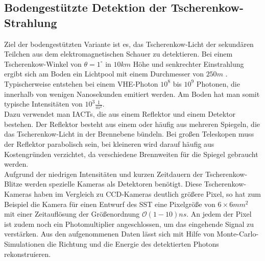 \subsection{Bodengestützte Detektion der Tscherenkow-Strahlung}
Ziel der bodengestützten Variante ist es, das Tscherenkow-Licht der sekundären Teilchen aus dem elektromagnetischen Schauer zu detektieren. Bei einem Tscherenkow-Winkel von $\theta=1^{\circ}$ in $10\unit{km}$ Höhe und senkrechter Einstrahlung ergibt sich am Boden ein Lichtpool mit einem Durchmesser von $250\unit{m}$ \cite{DesignConcept}.%
Typischerweise entstehen bei einem VHE-Photon $10^8$ bis $10^9$ Photonen, die innerhalb von wenigen Nanosekunden emitiert werden. Am Boden hat man somit typische Intensitäten von $10^3\unit{\frac{1}{m^2}}$.\\%
Dazu verwendet man IACTs, die aus einem Reflektor und einem Detektor bestehen. Der Reflektor besteht aus einem oder häufig aus mehreren Spiegeln, die das Tscherenkow-Licht in der Brennebene bündeln. Bei großen Teleskopen muss der Reflektor parabolisch sein, bei kleineren wird darauf häufig aus Kostengründen verzichtet, da verschiedene Brennweiten für die Spiegel gebraucht werden.\\
Aufgrund der niedrigen Intensitäten und kurzen Zeitdauern der Tscherenkow-Blitze werden spezielle Kameras als Detektoren benötigt. Diese Tscherenkow-Kameras haben im Vergleich zu CCD-Kameras deutlich größere Pixel, so hat zum Beispiel die Kamera für einen Entwurf des SST \cite{gct} eine Pixelgröße von $6 \times 6\unit{mm^2}$ mit einer Zeitauflösung der Größenordnung $\mathcal{O}(1-10)\unit{ns}$. An jedem der Pixel ist zudem noch ein Photomultiplier angeschlossen, um das eingehende Signal zu verstärken. Aus den aufgenommenen Daten lässt sich mit Hilfe von Monte-Carlo-Simulationen die Richtung und die Energie des detektierten Photons rekonstruieren. 

